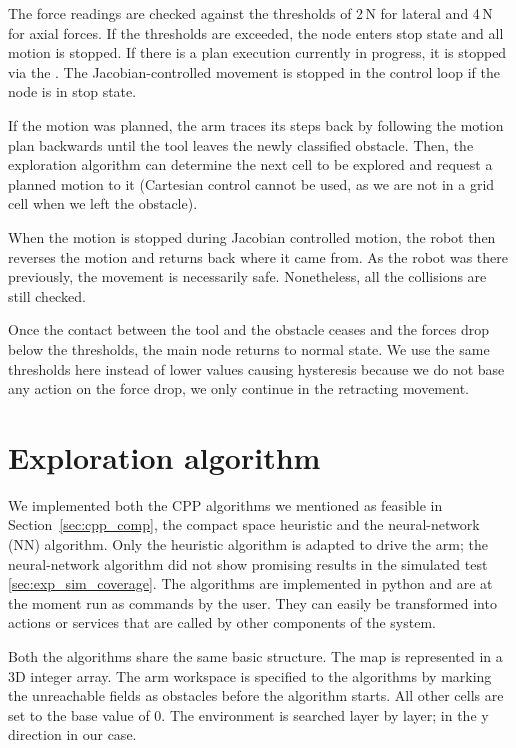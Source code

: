 \documentclass[buriama8_dp.tex]{subfiles}
\begin{document}
The force readings are checked against the thresholds of 2\,N for lateral and 4\,N for axial forces. If the thresholds are exceeded, the node enters stop state and all motion is stopped. If there is a plan execution currently in progress, it is stopped via the . The Jacobian-controlled movement is stopped in the control loop if the node is in stop state.

If the motion was planned, the arm traces its steps back by following the motion plan backwards until the tool leaves the newly classified obstacle. Then, the exploration algorithm can determine the next cell to be explored and request a planned motion to it (Cartesian control cannot be used, as we are not in a grid cell when we left the obstacle).

When the motion is stopped during Jacobian controlled motion, the robot then reverses the motion and returns back where it came from. As the robot was there previously, the movement is necessarily safe. Nonetheless, all the collisions are still checked.

Once the contact between the tool and the obstacle ceases and the forces drop below the thresholds, the main node returns to normal state. We use the same thresholds here instead of lower values causing hysteresis because we do not base any action on the force drop, we only continue in the retracting movement.


\section{Exploration algorithm}
\label{sec:alg_impl}

We implemented both the CPP algorithms we mentioned as feasible in Section~\ref{sec:cpp_comp}, the compact space heuristic and the neural-network (NN) algorithm. Only the heuristic algorithm is adapted to drive the arm; the neural-network algorithm did not show promising results in the simulated test \ref{sec:exp_sim_coverage}. The algorithms are implemented in python and are at the moment run as commands by the user. They can easily be transformed into actions or services that are called by other components of the system.

Both the algorithms share the same basic structure. The map is represented in a 3D integer array. The arm workspace is specified to the algorithms by marking the unreachable fields as obstacles before the algorithm starts. All other cells are set to the base value of 0. The environment is searched layer by layer; in the \m y direction in our case.
\end{document}

